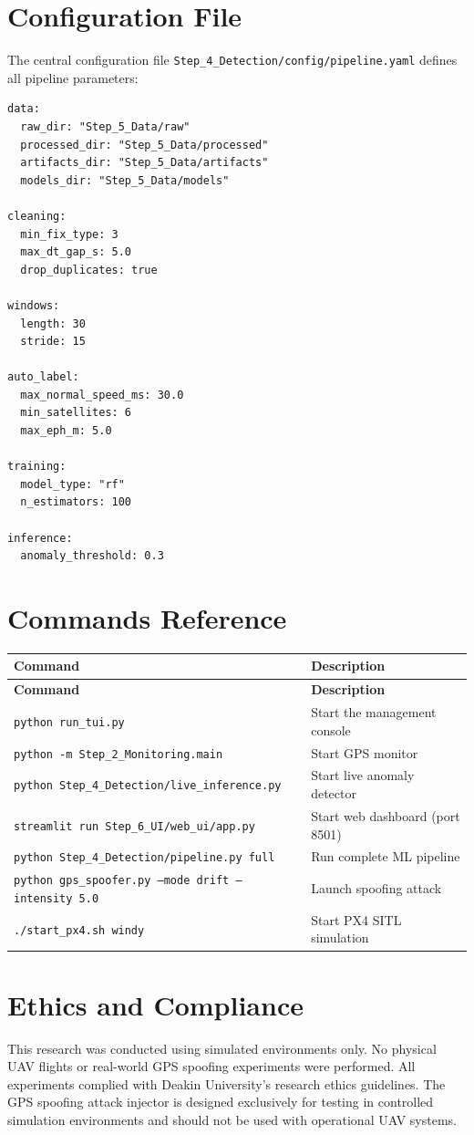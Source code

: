 \section{Configuration File}

The central configuration file \texttt{Step\_4\_Detection/config/pipeline.yaml} defines all pipeline parameters:

\begin{lstlisting}[language={}]
data:
  raw_dir: "Step_5_Data/raw"
  processed_dir: "Step_5_Data/processed"
  artifacts_dir: "Step_5_Data/artifacts"
  models_dir: "Step_5_Data/models"

cleaning:
  min_fix_type: 3
  max_dt_gap_s: 5.0
  drop_duplicates: true

windows:
  length: 30
  stride: 15

auto_label:
  max_normal_speed_ms: 30.0
  min_satellites: 6
  max_eph_m: 5.0

training:
  model_type: "rf"
  n_estimators: 100

inference:
  anomaly_threshold: 0.3
\end{lstlisting}

\section{Commands Reference}

\begin{longtable}{|p{4cm}|p{11cm}|}
\hline
\textbf{Command} & \textbf{Description} \\
\hline
\endfirsthead
\hline
\textbf{Command} & \textbf{Description} \\
\hline
\endhead
\hline
\texttt{python run\_tui.py} & Start the management console \\
\hline
\texttt{python -m Step\_2\_Monitoring.main} & Start GPS monitor \\
\hline
\texttt{python Step\_4\_Detection/live\_inference.py} & Start live anomaly detector \\
\hline
\texttt{streamlit run Step\_6\_UI/web\_ui/app.py} & Start web dashboard (port 8501) \\
\hline
\texttt{python Step\_4\_Detection/pipeline.py full} & Run complete ML pipeline \\
\hline
\texttt{python gps\_spoofer.py --mode drift --intensity 5.0} & Launch spoofing attack \\
\hline
\texttt{./start\_px4.sh windy} & Start PX4 SITL simulation \\
\hline
\end{longtable}

\section{Ethics and Compliance}

This research was conducted using simulated environments only. No physical UAV flights or real-world GPS spoofing experiments were performed. All experiments complied with Deakin University's research ethics guidelines. The GPS spoofing attack injector is designed exclusively for testing in controlled simulation environments and should not be used with operational UAV systems.
